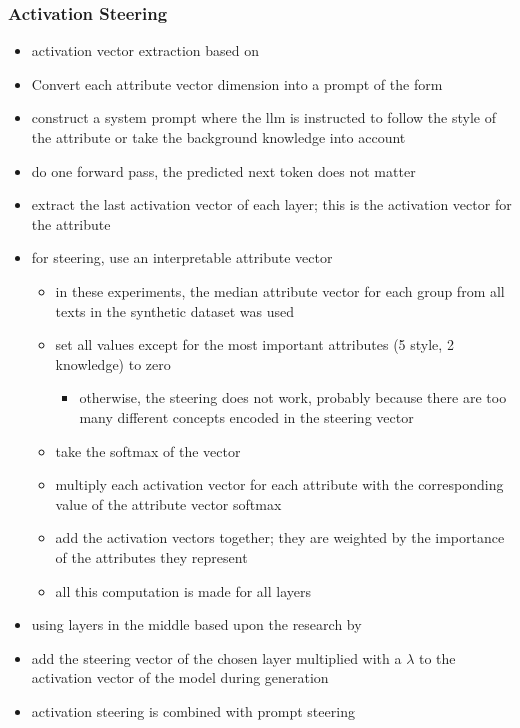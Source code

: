 \subsubsection{Activation Steering}
\label{sec:experiments:setup:steering:activation}

\begin{itemize}
  \item activation vector extraction based on \citet{konenStyleVectorsSteering2024,turnerActivationAdditionSteering2024,rimsky-etal-2024-steering}
  \item Convert each attribute vector dimension into a prompt of the form %
  \item construct a system prompt where the \ac{llm} is instructed to follow the style of the attribute or take the background knowledge into account %
  \item do one forward pass, the predicted next token does not matter
  \item extract the last activation vector of each layer; this is the activation vector for the attribute
  \item for steering, use an interpretable attribute vector
        \begin{itemize}
          \item in these experiments, the median attribute vector for each group from all texts in the synthetic dataset was used
          \item set all values except for the most important attributes (5 style, 2 knowledge) to zero
                \begin{itemize}
                  \item otherwise, the steering does not work, probably because there are too many different concepts encoded in the steering vector
                \end{itemize}
          \item take the softmax of the vector
          \item multiply each activation vector for each attribute with the corresponding value of the attribute vector softmax
          \item add the activation vectors together; they are weighted by the importance of the attributes they represent
          \item all this computation is made for all layers
        \end{itemize}
  \item using layers in the middle based upon the research by \citet{konenStyleVectorsSteering2024,bogdanEmergentEffectsScaling2025}
  \item add the steering vector of the chosen layer multiplied with a \(\lambda\) to the activation vector of the model during generation
  \item activation steering is combined with prompt steering
\end{itemize}
